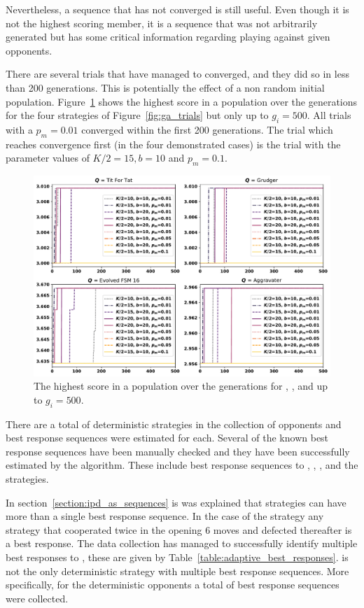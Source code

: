 Nevertheless, a sequence that has not converged is still useful. Even though
it is not the highest scoring member, it is a sequence that was not arbitrarily
generated but has some critical information regarding playing against given
opponents.

There are several trials that have managed to converged,
and they did so in less than 200 generations. This is potentially the effect of a
non random initial population.
Figure~\ref{fig:ga_trials_to_500}
shows the highest score in a population over the generations for the four
strategies of Figure~\ref{fig:ga_trials} but only up to \(g_i = 500\). All trials
with a \(p_m=0.01\) converged within the first 200 generations. The trial
which reaches convergence first (in the four demonstrated cases) is the trial
with the parameter values of \(K/2=15, b=10\) and \(p_m=0.1\).

\begin{figure}[!htbp]
    \centering
    \includegraphics[width=.9\textwidth]{src/chapters/06/img/gas_results_per_trial_to_generation_500.pdf}
    \caption{The highest score in a population over the generations for \TitForTat,
    \Grudger, \FSMSixTeen and \Aggravater up to \(g_i = 500\).}\label{fig:ga_trials_to_500}
\end{figure}

There are a total of \deterministicstrategies deterministic strategies in the
collection of opponents and best response sequences were estimated for each.
Several of the known best response sequences have been manually checked and they
have been successfully estimated by the algorithm. These include best response
sequences to \TitForTat, \Grudger, \Alternator, \Pavlov and the \Cycler strategies.

In section~\ref{section:ipd_as_sequences} is was explained that strategies can
have more than a single best response sequence. In the case of the strategy
\Adaptive any strategy that cooperated twice in the opening 6 moves and defected
thereafter is a best response. The data collection has managed to successfully identify
multiple best responses to \Adaptive, these are given by
Table~\ref{table:adaptive_best_responses}. \Adaptive is not the only
deterministic strategy with multiple best response sequences. More specifically,
for the \deterministicstrategies deterministic opponents a total of \deterministicsequences best
response sequences were collected.

